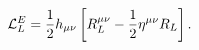 \begin{equation}
{\cal L}_L^E = \frac{1}{2}h_{\mu\nu} \left[ R^{\mu\nu}_L - \frac{1}{2} \eta^{\mu\nu} R_L\right].
\label{44}
\end{equation}

